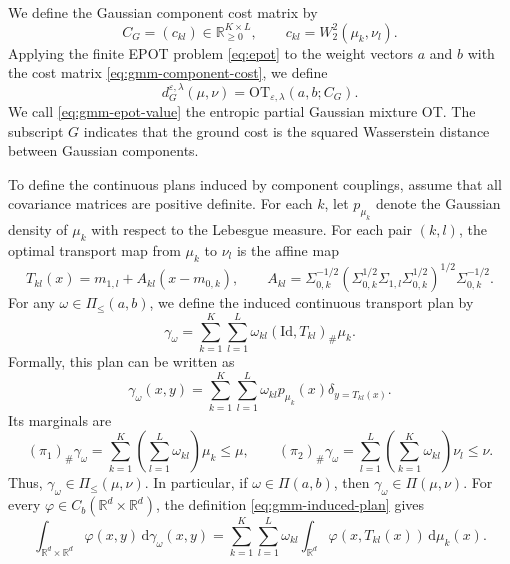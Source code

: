 \documentclass[a4paper,11pt]{article}
\numberwithin{equation}{section}
\newcommand{\eps}{\varepsilon}
\newcommand{\RR}{\mathbb{R}}
\newcommand{\Id}{\mathrm{Id}}
\newcommand{\OT}{\mathrm{OT}}
\newcommand{\dd}{\,\mathrm{d}}
\begin{document}
We define the Gaussian component cost matrix by
\begin{equation}\label{eq:gmm-component-cost}
  C_G=(c_{kl})\in\RR_{\geq0}^{K\times L},
  \qquad
  c_{kl}=W_2^2(\mu_k,\nu_l).
\end{equation}
Applying the finite EPOT problem \eqref{eq:epot} to the weight vectors $a$ and $b$ with the cost matrix \eqref{eq:gmm-component-cost}, we define
\begin{equation}\label{eq:gmm-epot-value}
  d_G^{\eps,\lambda}(\mu,\nu)=\OT_{\eps,\lambda}(a,b;C_G).
\end{equation}
We call \eqref{eq:gmm-epot-value} the entropic partial Gaussian mixture OT. The subscript $G$ indicates that the ground cost is the squared Wasserstein distance between Gaussian components.

To define the continuous plans induced by component couplings, assume that all covariance matrices are positive definite. For each $k$, let $p_{\mu_k}$ denote the Gaussian density of $\mu_k$ with respect to the Lebesgue measure. For each pair $(k,l)$, the optimal transport map from $\mu_k$ to $\nu_l$ is the affine map
\begin{equation}\label{eq:gaussian-optimal-map}
  T_{kl}(x)=m_{1,l}+A_{kl}(x-m_{0,k}),\qquad A_{kl}=\Sigma_{0,k}^{-1/2}\left(\Sigma_{0,k}^{1/2}\Sigma_{1,l}\Sigma_{0,k}^{1/2}\right)^{1/2}\Sigma_{0,k}^{-1/2}.
\end{equation}
For any $\omega\in\Pi_{\leq}(a,b)$, we define the induced continuous transport plan by
\begin{equation}\label{eq:gmm-induced-plan}
  \gamma_{\omega}=\sum_{k=1}^{K}\sum_{l=1}^{L}\omega_{kl}(\Id,T_{kl})_\#\mu_k.
\end{equation}
Formally, this plan can be written as
\begin{equation}\label{eq:gmm-induced-plan-formal}
  \gamma_{\omega}(x,y) = \sum_{k=1}^{K}\sum_{l=1}^{L}\omega_{kl}p_{\mu_k}(x)\delta_{y=T_{kl}(x)}.
\end{equation}
Its marginals are
\begin{equation*}
(\pi_1)_\#\gamma_{\omega}=\sum_{k=1}^{K}\left(\sum_{l=1}^{L}\omega_{kl}\right)\mu_k\leq\mu,\qquad (\pi_2)_\#\gamma_{\omega}=\sum_{l=1}^{L}\left(\sum_{k=1}^{K}\omega_{kl}\right)\nu_l\leq\nu.
\end{equation*}
Thus, $\gamma_{\omega}\in\Pi_{\leq}(\mu,\nu)$. In particular, if $\omega\in\Pi(a,b)$, then $\gamma_{\omega}\in\Pi(\mu,\nu)$. For every $\varphi\in C_b(\RR^d\times\RR^d)$, the definition \eqref{eq:gmm-induced-plan} gives
\begin{equation}\label{eq:gmm-induced-plan-test}
  \int_{\RR^d\times\RR^d}\varphi(x,y)\dd\gamma_{\omega}(x,y)=\sum_{k=1}^{K}\sum_{l=1}^{L}\omega_{kl}\int_{\RR^d}\varphi(x,T_{kl}(x))\dd\mu_k(x).
\end{equation}
\end{document}
